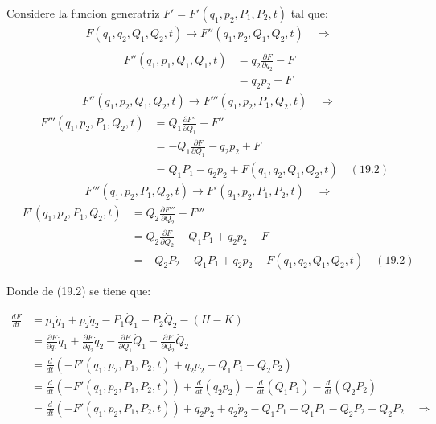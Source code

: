 \documentclass[a4paper]{article}
\begin{document}
\begin{answer}[Punto 19]
    
        \item Considere la funcion generatriz $F' = F'(q_1, p_2, P_1, P_2, t)$ tal que:
        \begin{align*}
            F(q_1, q_2, Q_1, Q_2, t)  \rightarrow F''(q_1, p_2, Q_1, Q_2, t) \quad \Rightarrow\\
        \end{align*} 
        \begin{align*}F''(q_1, p_1, Q_1, Q_1, t) &= q_2 \frac{\partial F}{\partial q_2}  - F\\
            &= q_2 p_2 - F
        \end{align*}
        \begin{align*}
            F''(q_1,p_2,Q_1,Q_2,t) \rightarrow F'''(q_1, p_2, P_1, Q_2, t) \quad \Rightarrow 
        \end{align*}
        \begin{align*}
            \quad F'''(q_1,p_2,P_1,Q_2,t) &= Q_1 \frac{\partial F''}{\partial Q_1}  - F''\\
            &= -Q_1 \frac{\partial F}{\partial Q_1}  - q_2 p_2 + F \\
            &= Q_1 P_1 - q_2 p_2 + F(q_1, q_2, Q_1, Q_2, t) \quad (19.2)
        \end{align*}
        \begin{align*}
            F'''(q_1,p_2,P_1,Q_2,t) \rightarrow F'(q_1, p_2, P_1, P_2, t) \quad \Rightarrow 
        \end{align*}
        \begin{align*}
            \quad F'(q_1,p_2,P_1,Q_2,t) &= Q_2 \frac{\partial F'''}{\partial Q_2}  - F'''\\
            &= Q_2 \frac{\partial F}{\partial Q_2}  -Q_1 P_1 +  q_2 p_2 - F \\
            &= -Q_2 P_2 - Q_1 P_1 + q_2 p_2 - F(q_1, q_2, Q_1, Q_2, t) \quad (19.2)
        \end{align*}

        Donde de (19.2) se tiene que:

        \begin{align*}
            \frac{dF}{dt}  &=p_1 \dot q_1 + p_2 \dot q_2 - P_1\dot Q_1- P_2 \dot Q_2 - (H - K)\\
            &= \frac{\partial F}{\partial q_1} \dot q_1 + \frac{\partial F}{\partial q_2} \dot q_2- \frac{\partial F}{\partial Q_1}\dot Q_1- \frac{\partial F}{\partial Q_2} \dot Q_2\\
            &= \frac d{dt}\left(-F'(q_1, p_2, P_1, P_2, t) + q_2 p_2 - Q_1 P_1 - Q_2P_2\right)\\
            &= \frac d{dt}\left(-F'(q_1, p_2, P_1, P_2, t) \right) + \frac d{dt}\left(q_2 p_2 \right) - \frac d{dt}\left(Q_1 P_1 \right) - \frac d{dt}\left(Q_2 P_2 \right)\\
            &= \frac d{dt}\left(-F'(q_1, p_2, P_1, P_2, t) \right) + \dot q_2 p_2 + q_2 \dot p_2 - \dot Q_1 P_1 - Q_1 \dot P_1 - \dot Q_2 P_2 - Q_2 \dot P_2 \quad \Rightarrow\\
        \end{align*}
        

\end{answer}
\end{document}
